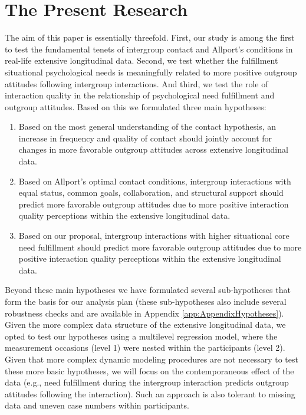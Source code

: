 \documentclass[man, 12pt, a4paper]{apa7}
\theoremstyle{break}
\theoremstyle{plain}
\begin{document}
\section{The Present Research}
The aim of this paper is essentially threefold. First, our study is among the first to test the fundamental tenets of intergroup contact and Allport's conditions in real-life extensive longitudinal data. Second, we test whether the fulfillment situational psychological needs is meaningfully related to more positive outgroup attitudes following intergroup interactions. And third, we test the role of interaction quality in  the relationship of psychological need fulfillment and outgroup attitudes. Based on this we formulated three main hypotheses:
\begin{enumerate}[label=H\arabic*:]
    \item Based on the most general understanding of the contact hypothesis, an increase in frequency and quality of contact should jointly account for changes in more favorable outgroup attitudes across extensive longitudinal data.
    \item Based on Allport’s optimal contact conditions, intergroup interactions with equal status, common goals, collaboration, and structural support should predict more favorable outgroup attitudes due to more positive interaction quality perceptions within the extensive longitudinal data.
    \item Based on our proposal, intergroup interactions with higher situational core need fulfillment should predict more favorable outgroup attitudes due to more positive interaction quality perceptions within the extensive longitudinal data.
\end{enumerate}
Beyond these main hypotheses we have formulated several sub-hypotheses that form the basis for our analysis plan (these sub-hypotheses also include several robustness checks and are available in Appendix \ref{app:AppendixHypotheses}). Given the more complex data structure of the extensive longitudinal data, we opted to test our hypotheses using a multilevel regression model, where the measurement occasions (level 1) were nested within the participants (level 2). Given that more complex dynamic modeling procedures are not necessary to test these more basic hypotheses, we will focus on the contemporaneous effect of the data (e.g., need fulfillment during the intergroup interaction predicts outgroup attitudes following the interaction). Such an approach is also tolerant to missing data and uneven case numbers within participants.
\end{document}
